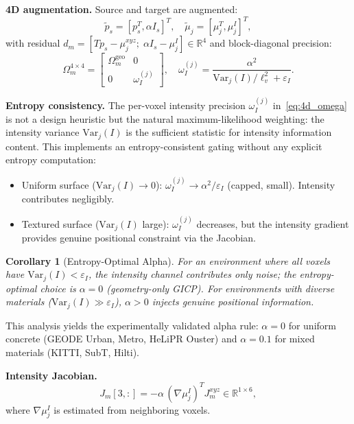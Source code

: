 \documentclass[journal,letterpaper,10pt]{IEEEtran}
\newtheorem{corollary}{Corollary}
\begin{document}
\textbf{4D augmentation.}
Source and target are augmented:
\begin{equation}
  \tilde{p}_s = [p_s^T, \alpha I_s]^T, \quad
  \tilde{\mu}_j = [\mu_j^T, \mu_j^I]^T,
  \label{eq:4d_aug}
\end{equation}
with residual $d_m = [Tp_s - \mu_j^{xyz};\; \alpha I_s - \mu_j^I]
\in \mathbb{R}^4$ and block-diagonal precision:
\begin{equation}
  \Omega_m^{4\times4} =
  \begin{bmatrix} \Omega_m^{\mathrm{geo}} & 0 \\ 0 & \omega_I^{(j)} \end{bmatrix},
  \quad
  \omega_I^{(j)} = \frac{\alpha^2}{\mathrm{Var}_j(I) / \ell_v^2 + \varepsilon_I}.
  \label{eq:4d_omega}
\end{equation}

\textbf{Entropy consistency.}
The per-voxel intensity precision $\omega_I^{(j)}$ in~\eqref{eq:4d_omega}
is not a design heuristic but the natural maximum-likelihood weighting:
the intensity variance $\mathrm{Var}_j(I)$ is the sufficient statistic
for intensity information content.
This implements an entropy-consistent gating without any explicit
entropy computation:
\begin{itemize}
  \item Uniform surface ($\mathrm{Var}_j(I) \to 0$):
    $\omega_I^{(j)} \to \alpha^2/\varepsilon_I$ (capped, small).
    Intensity contributes negligibly.
  \item Textured surface ($\mathrm{Var}_j(I)$ large):
    $\omega_I^{(j)}$ decreases, but the intensity gradient provides
    genuine positional constraint via the Jacobian.
\end{itemize}

\begin{corollary}[Entropy-Optimal Alpha]\label{cor:alpha}
For an environment where all voxels have $\mathrm{Var}_j(I) < \varepsilon_I$,
the intensity channel contributes only noise; the entropy-optimal
choice is $\alpha = 0$ (geometry-only GICP).
For environments with diverse materials ($\mathrm{Var}_j(I) \gg \varepsilon_I$),
$\alpha > 0$ injects genuine positional information.
\end{corollary}

This analysis yields the experimentally validated alpha rule:
$\alpha{=}0$ for uniform concrete (GEODE Urban, Metro, HeLiPR Ouster)
and $\alpha{=}0.1$ for mixed materials (KITTI, SubT, Hilti).

\textbf{Intensity Jacobian.}
\begin{equation}
  J_m[3,:] = -\alpha\,(\nabla\mu_j^I)^T J_m^{xyz} \in \mathbb{R}^{1\times6},
  \label{eq:intensity_jac}
\end{equation}
where $\nabla\mu_j^I$ is estimated from neighboring voxels.
\end{document}
